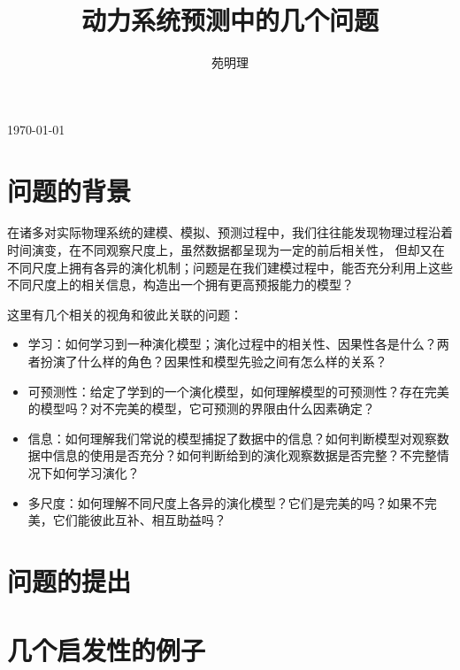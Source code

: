 \documentclass[a4paper,12pt]{article}
\title{动力系统预测中的几个问题}
\author{苑明理}
\date{}
\begin{document}

\maketitle{}

\begin{center}
  {\sihao \monthyeardate\today}\\[1ex]
\end{center}

\renewcommand\contentsname{目录}
\setcounter{tocdepth}{2}
\tableofcontents

\newpage

\section{问题的背景}

在诸多对实际物理系统的建模、模拟、预测过程中，我们往往能发现物理过程沿着时间演变，在不同观察尺度上，虽然数据都呈现为一定的前后相关性，
但却又在不同尺度上拥有各异的演化机制；问题是在我们建模过程中，能否充分利用上这些不同尺度上的相关信息，构造出一个拥有更高预报能力的模型？

这里有几个相关的视角和彼此关联的问题：

\begin{itemize}
\item 学习：如何学习到一种演化模型；演化过程中的相关性、因果性各是什么？两者扮演了什么样的角色？因果性和模型先验之间有怎么样的关系？
\item 可预测性：给定了学到的一个演化模型，如何理解模型的可预测性？存在完美的模型吗？对不完美的模型，它可预测的界限由什么因素确定？
\item 信息：如何理解我们常说的模型捕捉了数据中的信息？如何判断模型对观察数据中信息的使用是否充分？如何判断给到的演化观察数据是否完整？不完整情况下如何学习演化？
\item 多尺度：如何理解不同尺度上各异的演化模型？它们是完美的吗？如果不完美，它们能彼此互补、相互助益吗？
\end{itemize}

\section{问题的提出}

\section{几个启发性的例子}
\end{document}
